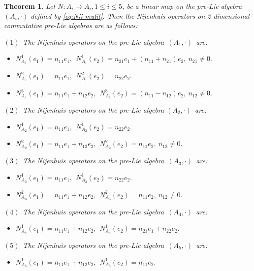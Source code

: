\documentclass[12pt, reqno]{amsart}
\theoremstyle{plain}
\newtheorem{theorem}{Theorem}[section]
\begin{document}
\begin{theorem}\label{Ni ope on 2 c}
Let $N:A_i\rightarrow A_i,1\leq i\leq 5$, be a linear map on the pre-Lie algebra $(A_i, \cdot)$ defined by \eqref{eq:Nii-mulit}. Then the Nijenhuis operators on 2-dimensional commutative pre-Lie algebras are as follows:

$(1)$~The Nijenhuis operators on the pre-Lie algebra~$(A_{1},\cdot)$~are:
\begin{itemize}
   \item[] $N_{A_{1}}^1(e_1)= n_{11}e_1,~~ N_{A_{1}}^1(e_2)= n_{21}e_1+(n_{11}+n_{21})e_2,~n_{21}\neq0.$
   \item[] $N_{A_{1}}^2(e_1)= n_{11}e_1,~~ N_{A_{1}}^2(e_2)= n_{22}e_2.$
   \item[]  $N_{A_{1}}^3(e_1)=n_{11}e_1+ n_{12}e_2 ,~~ N_{A_{1}}^3(e_2)= (n_{11}-n_{12})e_2,~n_{12}\neq0.$
   \end{itemize}

$(2)$~The Nijenhuis operators on the pre-Lie algebra $(A_{2},\cdot)$~are:
\begin{itemize}
   \item[] $N_{A_{2}}^1(e_1)= n_{11}e_1,~~ N_{A_{2}}^1(e_2)= n_{22}e_2.$
   \item[]  $N_{A_{2}}^2(e_1)=n_{11}e_1+ n_{12}e_2 ,~~ N_{A_{2}}^2(e_2)= n_{11}e_2,~n_{12}\neq0.$
   \end{itemize}

$(3)$~The Nijenhuis operators on the pre-Lie algebra~$(A_{3},\cdot)$~are:
\begin{itemize}
   \item[] $N_{A_{3}}^1(e_1)= n_{11}e_1,~~ N_{A_{3}}^1(e_2)= n_{22}e_2.$
   \item[]  $N_{A_{3}}^2(e_1)=n_{11}e_1+ n_{12}e_2 ,~~ N_{A_{3}}^2(e_2)= n_{11}e_2,~n_{12}\neq0.$
   \end{itemize}

$(4)$~The Nijenhuis operators on the pre-Lie algebra~$(A_{4},\cdot)$~are:
\begin{itemize}
   \item[] $N_{A_{4}}^1(e_1)= n_{11}e_1+n_{12}e_2,~~ N_{A_{4}}^1(e_2)= n_{21}e_1+n_{22}e_2.$
   \end{itemize}

$(5)$~The Nijenhuis operators on the pre-Lie algebra~$(A_{5},\cdot)$~are:
\begin{itemize}
   \item[]  $N_{A_{5}}^1(e_1)=n_{11}e_1+ n_{12}e_2 ,~~ N_{A_{5}}^1(e_2)= n_{11}e_2.$
   \end{itemize}
\end{theorem}
\end{document}
